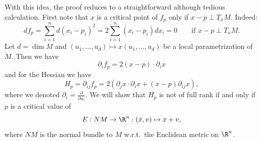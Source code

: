 \begin{figure}[H]
    \centering
    \label{fig:existence-of-morse-functions-normal-bundle-map}
\end{figure}

\begin{myproof}
    With this idea, the proof reduces to a straightforward although tedious calculation.
    First note that $x$ is a critical point of $f_p$ only if $x-p \perp T_x M$.
    Indeed:
    \[
        d f_p = \sum_{i=1}^{n} d(x_i - p_i)^2 = 2 \sum_{i=1}^{n} (x_i-p_i) dx_i = 0 \qquad \text{if $x-p \perp T_x M$}
    .\] 
    Let $d = \dim M$ and $(u_1, \ldots, u_d) \mapsto x(u_1, \ldots, u_d)$ be a local parametrization of $M$.
    Then we have
    \[
        \partial_i f_p = 2(x-p) \cdot  \partial_i  x
    \] 
    and for the Hessian we have
    \[
    H_p = \partial_{ij} f_p = 2 \left(\partial_j x \cdot \partial_i x  + (x-p) \partial_{ij} x \right)
    ,\] 
    where we denoted $\partial_i = \frac{\partial }{\partial u_i}$.
    We will show that $H_p$ is not of full rank if and only if $p$ is a critical value of  
    \[
        E: NM \to  \R^n: (x, v) \mapsto x + v
    ,\] 
    where $NM$ is the normal bundle to $M$ w.r.t.\ the Euclidean metric on $\R^n$.


\end{myproof}
